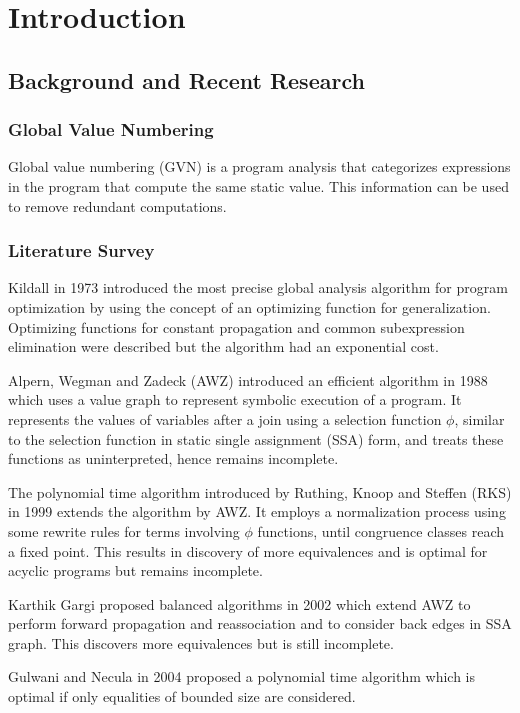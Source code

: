\chapter{Introduction}

\section{Background and Recent Research}
\subsection{Global Value Numbering}
Global value numbering (GVN) is a program analysis that categorizes expressions in the program that compute the same static value\cite{vandrunen}. This information can be used to remove redundant computations.


\subsection{Literature Survey}
Kildall in 1973\cite{kildall} introduced the most precise global analysis algorithm for program optimization by using the concept of an optimizing function for generalization. Optimizing functions for constant propagation and common subexpression elimination were described but the algorithm had an exponential cost.

Alpern, Wegman and Zadeck (AWZ) introduced an efficient algorithm in 1988\cite{awz} which uses a value graph to represent symbolic execution of a program. It represents the values of variables after a join using a selection function $\phi$, similar to the selection function in static single assignment (SSA) form, and treats these functions as uninterpreted, hence remains incomplete.

The polynomial time algorithm introduced by Ruthing, Knoop and Steffen (RKS) in 1999\cite{ruthing} extends the algorithm by AWZ. It employs a normalization process using some rewrite rules for terms involving $\phi$ functions, until congruence classes reach a fixed point. This results in discovery of more equivalences and is optimal for acyclic programs but remains incomplete.

Karthik Gargi proposed balanced algorithms in 2002\cite{gargi} which extend AWZ to perform forward propagation and reassociation and to consider back edges in SSA graph. This discovers more equivalences but is still incomplete.

Gulwani and Necula in 2004\cite{gulwani} proposed a polynomial time algorithm which is optimal if only equalities of bounded size are considered.

